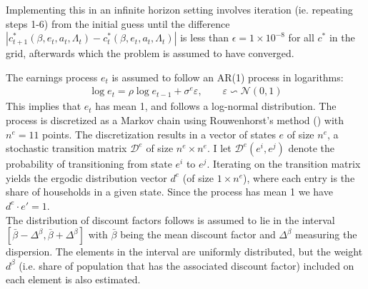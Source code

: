 Implementing this in an infinite horizon setting involves iteration (ie. repeating steps 1-6) from the initial guess until the difference $\left|c_{t+1}^{*}\left(\beta,e_{t},a_{t},\Lambda_{t}\right)-c_{t}^{*}\left(\beta,e_{t},a_{t},\Lambda_{t}\right)\right|$ is less than $\epsilon=1\times10^{-8}$ for all $c^{*}$ in the grid, afterwards which the problem is assumed to have converged.  

The earnings process $e_t$ is assumed to follow an AR(1) process in logarithms:
\begin{align*}
\log e_{t}=\rho\log e_{t-1}+\sigma^{e}\varepsilon, \qquad \varepsilon\backsim\mathcal{N}\left(0,1\right) 
\end{align*}
This implies that $e_t$ has mean 1, and follows a log-normal distribution. The process is discretized as a Markov chain using Rouwenhorst's method (\citet{rouwenhorstk}) with $n^e=11$ points. The discretization results in a vector of states $e$ of size $n^e$, a stochastic transition matrix $\mathcal{D}^{e}$ of size $n^{e}\times n^{e}$. I let $\mathcal{D}^{e}\left(e^{i},e^{j}\right)$ denote the probability of transitioning from state $e^i$ to $e^j$. Iterating on the transition matrix yields the ergodic distribution vector $d^{e}$ (of size $1\times n^{e}$), where each entry is the share of households in a given state. Since the process has mean 1 we have $d^{e}\cdot e'=1$. \\
The distribution of discount factors follows is assumed to lie in the interval $\left[\bar{\beta}-\Delta^{\beta},\bar{\beta}+\Delta^{\beta}\right]$ with $\bar{\beta}$ being the mean discount factor and $\Delta^{\beta}$ measuring the dispersion. The elements in the interval are uniformly distributed, but the weight $d^{\beta}$ (i.e. share of population that has the associated discount factor) included on each element is also estimated. \\
